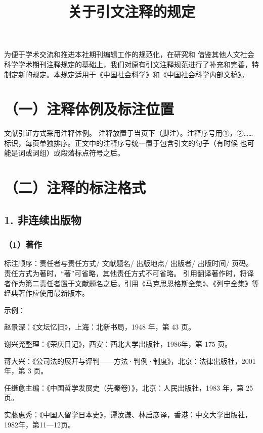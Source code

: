\documentclass{article}
\title{关于引文注释的规定}
\begin{document}
\maketitle

为便于学术交流和推进本社期刊编辑工作的规范化，在研究和 借鉴其他人文社会科学学术期刊注释规定的基础上，我们对原有引文注释规范进行了补充和完善，特制定新的规定。本规定适用于《中国社会科学》和《中国社会科学内部文稿》。

\section*{（一）注释体例及标注位置}

文献引证方式采用注释体例。
注释放置于当页下（脚注）。注释序号用①，②……标识，每页单独排序。正文中的注释序号统一置于包含引文的句子（有时候 也可能是词或词组）或段落标点符号之后。

\section*{（二）注释的标注格式}

\subsection*{1. 非连续出版物}

\subsubsection*{（1）著作}
标注顺序：责任者与责任方式/ 文献题名/ 出版地点/ 出版者/ 出版时间/ 页码。
责任方式为著时，“著”可省略，其他责任方式不可省略。
引用翻译著作时，将译者作为第二责任者置于文献题名之后。引用《马克思恩格斯全集》、《列宁全集》等经典著作应使用最新版本。
    
示例：
        
赵景深：《文坛忆旧》，上海：北新书局，1948 年，第 43 页。

谢兴尧整理：《荣庆日记》，西安：西北大学出版社，1986年，第 175 页。

蒋大兴：《公司法的展开与评判——方法·判例·制度》，北京：法律出版社，2001 年，第 3 页。

任继愈主编：《中国哲学发展史（先秦卷）》，北京：人民出版社，1983 年，第 25 页。

实藤惠秀：《中国人留学日本史》，谭汝谦、林启彦译，香港：中文大学出版社，1982年，第11—12页。
\end{document}
